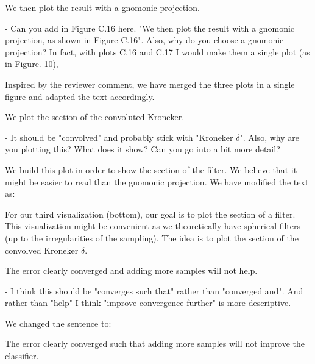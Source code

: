 \documentclass[12pt,a4paper]{article}
\newcommand{\1}{\b{1}}              %
\newcommand{\0}{\b{0}}              %
\begin{document}
\begin{mdframed}[style=comment]
We then plot the result with a gnomonic projection.

- Can you add in Figure C.16 here. "We then plot the result with a gnomonic projection, as shown in Figure C.16". Also, why do you choose a gnomonic projection? In fact, with plots C.16 and C.17 I would make them a single plot (as in Figure. 10),
\end{mdframed}
Inspired by the reviewer comment, we have merged the three plots in a single figure and adapted the text accordingly.

\begin{mdframed}[style=comment]
We plot the section of the convoluted Kroneker.

- It should be "convolved" and probably stick with "Kroneker $\delta$". Also, why are you plotting this? What does it show? Can you go into a bit more detail?
\end{mdframed}
We build this plot in order to show the section of the filter. We believe that it might be easier to read than the gnomonic projection. We have modified the text as:
\begin{mdframed}[style=manuscript]
For our third visualization (bottom), our goal is to plot the section of a filter. This visualization might be convenient as we theoretically have spherical filters (up to the irregularities of the sampling). The idea is to plot the section of the convolved Kroneker $\delta$.
\end{mdframed}

\begin{mdframed}[style=comment]
The error clearly converged and adding more samples will not help.

- I think this should be "converges such that" rather than "converged and". And rather than "help" I think "improve convergence further" is more descriptive.
\end{mdframed}
We changed the sentence to:
\begin{mdframed}[style=manuscript]
The error clearly converged such that adding more samples will not improve the classifier.
\end{mdframed}
\end{document}
